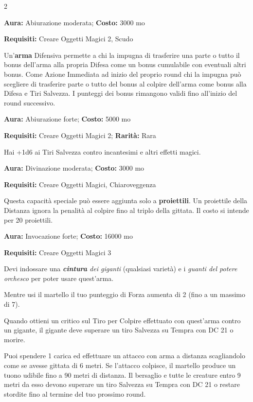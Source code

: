 \begin{multicols}{2}

\textbf{Aura:} Abiurazione moderata; \textbf{Costo:} 3000 mo

\textbf{Requisiti:} Creare Oggetti Magici 2, Scudo

Un'\textbf{arma} Difensiva permette a chi la impugna di trasferire una parte o tutto il bonus dell'arma alla propria Difesa come un bonus cumulabile con eventuali altri bonus. Come Azione Immediata ad inizio del proprio round chi la impugna può scegliere di trasferire parte o tutto del bonus al colpire dell'arma come bonus alla Difesa e Tiri Salvezza. I punteggi dei bonus rimangono validi fino all'inizio del round successivo.


\textbf{Aura:} Abiurazione forte; \textbf{Costo:} 5000 mo

\textbf{Requisiti:} Creare Oggetti Magici 2; \textbf{Rarità:} Rara

Hai +1d6 ai Tiri Salvezza contro incantesimi e altri effetti magici.


\textbf{Aura:} Divinazione moderata; \textbf{Costo:} 3000 mo

\textbf{Requisiti:} Creare Oggetti Magici, Chiaroveggenza

Questa capacità speciale può essere aggiunta solo a \textbf{proiettili}. Un proiettile della Distanza ignora la penalità al colpire fino al triplo della gittata. Il costo si intende per 20 proiettili.


\textbf{Aura:} Invocazione forte; \textbf{Costo:} 16000 mo

\textbf{Requisiti:} Creare Oggetti Magici 3

Devi indossare una \emph{\textbf{cintura} dei giganti} (qualsiasi varietà) e i \emph{guanti del potere orchesco} per poter usare quest'arma.

Mentre usi il martello il tuo punteggio di Forza aumenta di 2 (fino a un massimo di 7).

Quando ottieni un critico sul Tiro per Colpire effettuato con quest'arma contro un gigante, il gigante deve superare un tiro Salvezza su Tempra con DC 21 o morire.

Puoi spendere 1 carica ed effettuare un attacco con arma a distanza scagliandolo come se avesse gittata di 6 metri. Se l'attacco colpisce, il martello produce un tuono udibile fino a 90 metri di distanza. Il bersaglio e tutte le creature entro 9 metri da esso devono superare un tiro Salvezza su Tempra con DC 21 o restare stordite fino al termine del tuo prossimo round.


\end{multicols}
